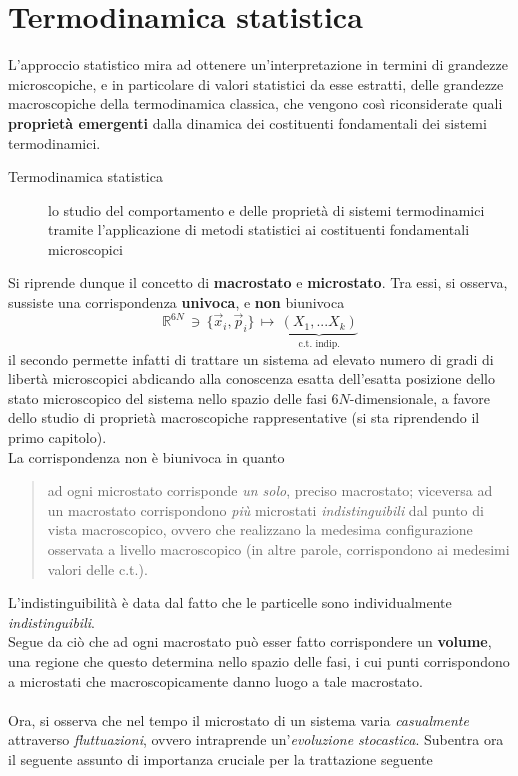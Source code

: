 \documentclass[10pt, oneside]{book}
\begin{document}
\chapter{Termodinamica statistica}
L'approccio statistico mira ad ottenere un'interpretazione in termini di grandezze microscopiche, e in particolare di valori statistici da esse estratti, delle grandezze macroscopiche della termodinamica classica, che vengono così riconsiderate quali \textbf{proprietà emergenti} dalla dinamica dei costituenti fondamentali dei sistemi termodinamici.\\
\begin{description}
\item[Termodinamica statistica] lo studio del comportamento e delle proprietà di sistemi termodinamici tramite l'applicazione di metodi statistici ai costituenti fondamentali microscopici
\end{description}
Si riprende dunque il concetto di \textbf{macrostato} e \textbf{microstato}. Tra essi, si osserva, sussiste una corrispondenza \textbf{univoca}, e \textbf{non} biunivoca
\[\mathbb{R}^{6N} \, \owns \, \{\vec{x}_i, \vec{p}_i\} \, \longmapsto \, \underbrace{(X_1, ... X_k)}_{\textrm{c.t. indip.}}\]
il secondo permette infatti di trattare un sistema ad elevato numero di gradi di libertà microscopici abdicando alla conoscenza esatta dell'esatta posizione dello stato microscopico del sistema nello spazio delle fasi $6N$-dimensionale, a favore dello studio di proprietà macroscopiche rappresentative (si sta riprendendo il primo capitolo).\\
La corrispondenza non è biunivoca in quanto
\begin{quote}
ad ogni microstato corrisponde \textit{un solo}, preciso macrostato; viceversa ad un macrostato corrispondono \textit{più} microstati \textit{indistinguibili} dal punto di vista macroscopico, ovvero che realizzano la medesima configurazione osservata a livello macroscopico (in altre parole, corrispondono ai medesimi valori delle c.t.).
\end{quote}
L'indistinguibilità è data dal fatto che le particelle sono individualmente \textit{indistinguibili}.\\
Segue da ciò che ad ogni macrostato può esser fatto corrispondere un \textbf{volume}, una regione che questo determina nello spazio delle fasi, i cui punti corrispondono a microstati che macroscopicamente danno luogo a tale macrostato.\\~\\
Ora, si osserva che nel tempo il microstato di un sistema varia \textit{casualmente} attraverso \textit{fluttuazioni}, ovvero intraprende un'\textit{evoluzione stocastica}. Subentra ora il seguente assunto di importanza cruciale per la trattazione seguente
\end{document}
